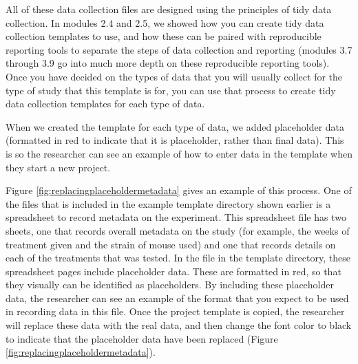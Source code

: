 \documentclass[]{tufte-book}
\begin{document}
All of these data collection files are designed using the principles of tidy
data collection. In modules 2.4 and 2.5, we showed how you can create tidy data
collection templates to use, and how these can be paired with
reproducible reporting tools to separate the steps of data collection and
reporting (modules 3.7 through 3.9 go into much more depth on these reproducible
reporting tools). Once you have decided on the types of data that you will
usually collect for the type of study that this template is for, you can use
that process to create tidy data collection templates for each type of data.

When we created the template for each type of data, we added placeholder data
(formatted in red to indicate that it is placeholder, rather than final
data). This is so the researcher can see an example of how to enter data in
the template when they start a new project.

Figure \ref{fig:replacingplaceholdermetadata} gives an example of this process.
One of the files that is included in the example template directory shown
earlier is a spreadsheet to record metadata on the experiment. This spreadsheet
file has two sheets, one that records overall metadata on the study (for
example, the weeks of treatment given and the strain of mouse used) and one that
records details on each of the treatments that was tested. In the file in the
template directory, these spreadsheet pages include placeholder data. These are
formatted in red, so that they visually can be identified as placeholders. By
including these placeholder data, the researcher can see an example of the
format that you expect to be used in recording data in this file. Once the
project template is copied, the researcher will replace these data with the real
data, and then change the font color to black to indicate that the placeholder
data have been replaced (Figure \ref{fig:replacingplaceholdermetadata}).
\end{document}
